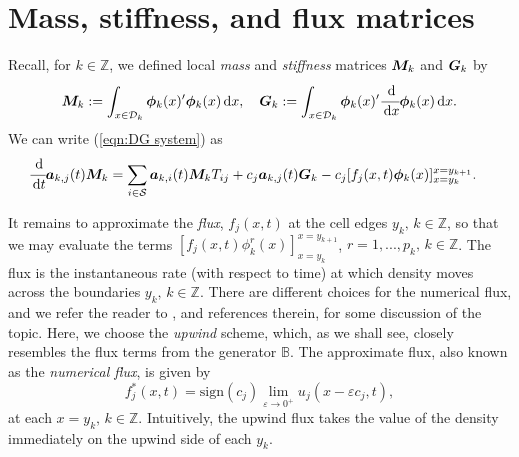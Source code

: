 \section{Mass, stiffness, and flux matrices}
Recall, for \(k\in\mathbb Z\), we defined local \textit{mass} and \textit{stiffness} matrices \(\boldsymbol M_k\) and \(\boldsymbol G_k\) by 
\[\boldsymbol M_k := \int_{x\in\mathcal{D}_k}\boldsymbol \phi_k(x)'{}\boldsymbol \phi_k(x)\, \mathrm{d} x,\quad \boldsymbol G_k := \int_{x\in\mathcal{D}_k}\boldsymbol \phi_k(x)'{}\cfrac{\, \mathrm{d}}{\, \mathrm{d} x} \boldsymbol \phi_k(x)\, \mathrm{d} x.\]
We can write (\ref{eqn:DG system}) as 
\begin{align}
	&\cfrac{\, \mathrm{d}}{\, \mathrm{d} t} \boldsymbol a_{k,j}(t) \boldsymbol M_k = \sum_{i\in\mathcal{S}} \boldsymbol a_{k,i}(t)\boldsymbol M_kT_{ij} 
	+  c_j\boldsymbol a_{k,j}(t) \boldsymbol G_k - c_j[f_j(x,t)\boldsymbol\phi_k(x)]_{x=y_k}^{x=y_{k+1}}.\label{eqn:DG matrix}
\end{align}

It remains to approximate the \textit{flux}, \(f_j(x,t)\) at the cell edges \(y_k,\,k\in\mathbb Z\), so that we may evaluate the terms \([f_j(x,t)\phi^r_k(x)]_{x=y_k}^{x=y_{k+1}}\), \(r=1,...,p_k,\,k\in\mathbb Z\). %
The flux is the instantaneous rate (with respect to time) at which density moves across the boundaries \(y_k,\,k\in\mathbb Z\). There are different choices for the numerical flux, and we refer the reader to \citep{c99,nodalDGBook}, and references therein, for some discussion of the topic. Here, we choose the \textit{upwind} scheme, which, as we shall see, closely resembles the flux terms from the generator \(\mathbb B\). The approximate flux, also known as the \textit{numerical flux}, is given by 
\[f^*_j(x,t) = \mathrm{sign}(c_j)\lim_{\varepsilon\to0^+}u_j(x-\varepsilon c_j,t),\]
at each \(x=y_k,\,k\in\mathbb Z\). 
Intuitively, the upwind flux takes the value of the density immediately on the upwind side of each \(y_k\). 

